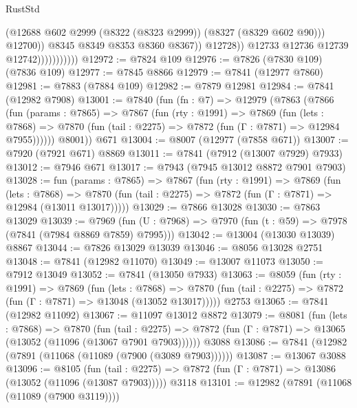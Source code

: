 \begin{lexlean}{RustStd}
\begin{coremodule}
{\begin{coremodule}
{{{{{{{{{{{{{{{{{{{{{{{{{{{{{{{{{{{{{{{{{{{{{{{{{{{{{{                                      (@12688
                                        @602
                                        @2999
                                        (@8322 (@8323 @2999))
                                        (@8327 (@8329 @602 @90)))
                                      @12700))
                                  @8345
                                  @8349
                                  @8353
                                  @8360
                                  @8367))
                              @12728))
                          @12733
                          @12736
                          @12739
                          @12742)))))))))))
@12972 := @7824 @109
@12976 := @7826 (@7830 @109) (@7836 @109)
@12977 := @7845 @8866
@12979 := @7841 (@12977 @7860)
@12981 := @7883 (@7884 @109)
@12982 := @7879 @12981
@12984 := @7841 (@12982 @7908)
@13001 := @7840
    (fun (fn : @7) =>
    @12979
      (@7863
        (@7866
          (fun (params : @7865) =>
          @7867
            (fun (rty : @1991) =>
            @7869
              (fun (lets : @7868) =>
              @7870 (fun (tail : @2275) => @7872 (fun (Γ : @7871) => @12984 @7955))))))
        @8001))
    @671
@13004 := @8007 (@12977 (@7858 @671))
@13007 := @7920 (@7921 @671) @8869
@13011 := @7841 (@7912 (@13007 @7929) @7933)
@13012 := @7946 @671
@13017 := @7943 (@7945 @13012 @8872 @7901 @7903)
@13028 := fun (params : @7865) =>
  @7867
    (fun (rty : @1991) =>
    @7869
      (fun (lets : @7868) =>
      @7870 (fun (tail : @2275) => @7872 (fun (Γ : @7871) => @12984 (@13011 @13017)))))
@13029 := @7866 @13028
@13030 := @7863 @13029
@13039 := @7969
    (fun (U : @7968) => @7970 (fun (t : @59) => @7978 (@7841 (@7984 @8869 @7859) @7995)))
@13042 := @13004 (@13030 @13039) @8867
@13044 := @7826 @13029 @13039
@13046 := @8056 @13028 @2751
@13048 := @7841 (@12982 @11070)
@13049 := @13007 @11073
@13050 := @7912 @13049
@13052 := @7841 (@13050 @7933)
@13063 := @8059
    (fun (rty : @1991) =>
    @7869
      (fun (lets : @7868) =>
      @7870 (fun (tail : @2275) => @7872 (fun (Γ : @7871) => @13048 (@13052 @13017)))))
    @2753
@13065 := @7841 (@12982 @11092)
@13067 := @11097 @13012 @8872
@13079 := @8081
    (fun (lets : @7868) =>
    @7870
      (fun (tail : @2275) =>
      @7872 (fun (Γ : @7871) => @13065 (@13052 (@11096 (@13067 @7901 @7903))))))
    @3088
@13086 := @7841 (@12982 (@7891 (@11068 (@11089 (@7900 (@3089 @7903))))))
@13087 := @13067 @3088
@13096 := @8105
    (fun (tail : @2275) => @7872 (fun (Γ : @7871) => @13086 (@13052 (@11096 (@13087 @7903)))))
    @3118
@13101 := @12982 (@7891 (@11068 (@11089 (@7900 @3119))))
}}}}}}}}}}}}}}}}}}}}}}}}}}}}}}}}}}}}}}}}}}}}}}}}}}}}}}
\end{coremodule}}
\end{coremodule}
\end{lexlean}
